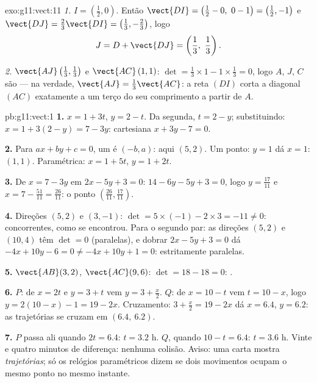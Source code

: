 \begin{solution}{exo:g11:vect:11}
\emph{1.} $I = \left(\frac12, 0\right)$. Então
$\vect{DI} = \left(\frac12 - 0,\ 0 - 1\right) = \left(\frac12,
-1\right)$ e $\vect{DJ} = \frac23\vect{DI} = \left(\frac13,
-\frac23\right)$, logo
\[
J = D + \vect{DJ} = \left(\frac13,\ \frac13\right).
\]

\emph{2.} $\vect{AJ}\left(\frac13, \frac13\right)$ e
$\vect{AC}\,(1, 1)$:
$\det = \frac13 \times 1 - 1 \times \frac13 = 0$, logo $A$, $J$, $C$ são
 --- na verdade, $\vect{AJ} = \frac13\vect{AC}$: a reta $(DI)$
corta a diagonal $(AC)$ exatamente a um terço do seu comprimento a
partir de $A$.
\end{solution}

\begin{solution}{pb:g11:vect:1}
\textbf{1.} $x = 1 + 3t$, $y = 2 - t$. Da segunda,
$t = 2 - y$; substituindo: $x = 1 + 3(2 - y) = 7 - 3y$:
 cartesiana $x + 3y - 7 = 0$.

\textbf{2.} Para $ax + by + c = 0$, um  é
$(-b, a)$: aqui $(5, 2)$. Um ponto: $y = 1$ dá $x = 1$:
$(1, 1)$. Paramétrica: $x = 1 + 5t$, $y = 1 + 2t$.

\textbf{3.} De $x = 7 - 3y$ em $2x - 5y + 3 = 0$:
$14 - 6y - 5y + 3 = 0$, logo $y = \frac{17}{11}$ e
$x = 7 - \frac{51}{11} = \frac{26}{11}$: o ponto
$\left(\frac{26}{11}, \frac{17}{11}\right)$.

\textbf{4.} Direções $(5, 2)$ e $(3, -1)$:
$\det = 5 \times (-1) - 2 \times 3 = -11 \neq 0$: concorrentes,
como se encontrou. Para o segundo par: as direções $(5, 2)$ e
$(10, 4)$ têm $\det = 0$ (paralelas), e dobrar
$2x - 5y + 3 = 0$ dá $-4x + 10y - 6 = 0 \neq -4x + 10y + 1 = 0$:
estritamente paralelas.

\textbf{5.} $\vect{AB}(3, 2)$, $\vect{AC}(9, 6)$:
$\det = 18 - 18 = 0$: .

\textbf{6.} $P$: de $x = 2t$ e $y = 3 + t$ vem
$y = 3 + \frac x2$. $Q$: de $x = 10 - t$ vem $t = 10 - x$, logo
$y = 2(10 - x) - 1 = 19 - 2x$. Cruzamento:
$3 + \frac x2 = 19 - 2x$ dá $x = 6.4$, $y = 6.2$: as
trajetórias se cruzam em $(6.4,\ 6.2)$.

\textbf{7.} $P$ passa ali quando $2t = 6.4$: $t = 3.2$ h. $Q$,
quando $10 - t = 6.4$: $t = 3.6$ h. Vinte e quatro minutos de
diferença: nenhuma colisão. Aviso: uma carta mostra
\emph{trajetórias}; só os relógios paramétricos dizem se dois
movimentos ocupam o mesmo ponto no mesmo instante.


\end{solution}
